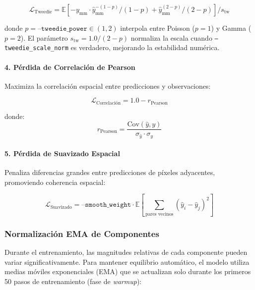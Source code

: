 \begin{equation}
\mathcal{L}_{\text{Tweedie}} = \mathbb{E}\left[-y_{\text{mm}} \cdot \hat{y}_{\text{mm}}^{-(1-p)} / (1-p) + \hat{y}_{\text{mm}}^{(2-p)} / (2-p)\right] / s_{\text{tw}}
\end{equation}

donde $p = \texttt{--tweedie\_power} \in (1, 2)$ interpola entre Poisson ($p=1$) y Gamma ($p=2$). El parámetro $s_{\text{tw}} = 1.0 / (2 - p)$ normaliza la escala cuando \texttt{--tweedie\_scale\_norm} es verdadero, mejorando la estabilidad numérica.

\paragraph{4. Pérdida de Correlación de Pearson}
Maximiza la correlación espacial entre predicciones y observaciones:

\begin{equation}
\mathcal{L}_{\text{Correlación}} = 1.0 - r_{\text{Pearson}}
\end{equation}

donde:
\begin{equation}
r_{\text{Pearson}} = \frac{\text{Cov}(\hat{y}, y)}{\sigma_{\hat{y}} \cdot \sigma_y}
\end{equation}

\paragraph{5. Pérdida de Suavizado Espacial}
Penaliza diferencias grandes entre predicciones de píxeles adyacentes, promoviendo coherencia espacial:

\begin{equation}
\mathcal{L}_{\text{Suavizado}} = \texttt{--smooth\_weight} \cdot \mathbb{E}\left[\sum_{\text{pares vecinos}} (\hat{y}_i - \hat{y}_j)^2\right]
\end{equation}

\subsubsection{Normalización EMA de Componentes}

Durante el entrenamiento, las magnitudes relativas de cada componente pueden variar significativamente. Para mantener equilibrio automático, el modelo utiliza medias móviles exponenciales (EMA) que se actualizan solo durante los primeros 50 pasos de entrenamiento (fase de \textit{warmup}):


